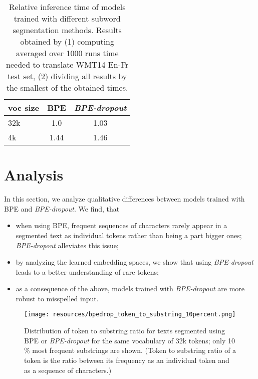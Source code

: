 \documentclass[11pt,a4paper]{article}
\begin{document}
\begin{table}[t!]
\centering
\begin{tabular}{l|cc}
\toprule
voc size & BPE & \textit{BPE-dropout}\\
\midrule
32k & 1.0 & 1.03 \\
4k & 1.44 & 1.46 \\

\bottomrule
\end{tabular}
\caption{Relative inference time of models trained with different subword segmentation methods. Results obtained by (1) computing averaged over 1000 runs time needed to translate WMT14 En-Fr test set, (2) dividing all results by the smallest of the obtained times. }
\label{tab:timing}
\end{table}




 
\section{Analysis}
\label{sect:analysis}








In this section, we analyze qualitative differences between models trained with BPE and \textit{BPE-dropout}. We find, that 
\begin{itemize}
    \item when using BPE, frequent sequences of characters rarely appear in a segmented text as individual tokens rather than being a part bigger ones; \textit{BPE-dropout} alleviates this issue;
    \item by analyzing the learned embedding spaces, we show that using \textit{BPE-dropout} leads to a better understanding of rare tokens;
    \item as a consequence of the above, models trained with \textit{BPE-dropout} are more robust to misspelled input.
\end{itemize}


\begin{figure}[t!]
    \centering
    
    \texttt{[image: resources/bpedrop\_token\_to\_substring\_10percent.png]}
    
    
    \caption{Distribution of token to substring ratio for texts segmented using BPE or \textit{BPE-dropout} for the same vocabulary of 32k tokens; only 10$\%$ most frequent substrings are shown.  (Token to substring ratio of a token is the ratio between its frequency as an individual token and as a sequence of characters.)  }\label{fig:token_frequency}
\end{figure}
\end{document}
